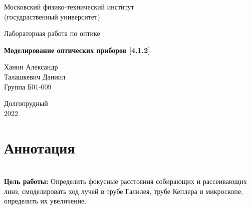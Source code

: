 \documentclass[a4paper, 12pt]{article}%
\begin{document}
\begin{titlepage}

	\newpage
	\begin{center}
		\normalsize Московский физико-технический институт \\(госудраственный 			университет)
	\end{center}

	\vspace{6em}

	\begin{center}
		\Large Лабораторная работа по оптике\\
	\end{center}

	\vspace{1em}

	\begin{center}
		\large \textbf{Моделирование оптических приборов [4.1.2]}
	\end{center}

	\vspace{2em}

	\begin{center}
		\large Ханин Александр	\\
		\large Талашкевич Даниил \\
		Группа Б01-009
	\end{center}

	\vspace{\fill}

	\begin{center}
	Долгопрудный \\2022
	\end{center}
	
\end{titlepage}



	\thispagestyle{empty}
	\newpage
	\tableofcontents
	\newpage
	\setcounter{page}{1}
	
	\section{Аннотация}	

$ $\\
	
	\textbf{Цель работы:} Определить фокусные расстояния собирающих и рассеивающих линз, смоделировать ход лучей в трубе Галилея, трубе Кеплера и микроскопе, определить их увеличение. \\
	
\end{document}
